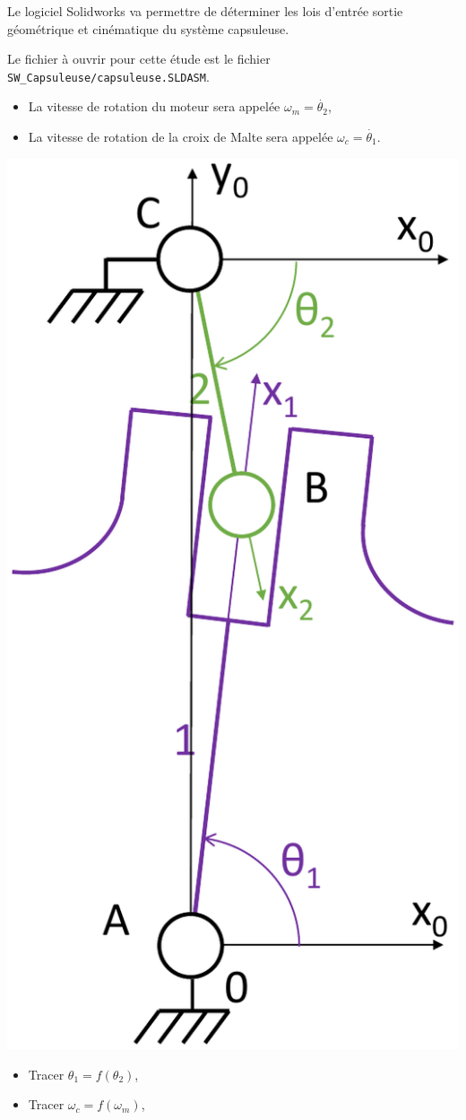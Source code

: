 
\newpage


Le logiciel Solidworks va permettre de déterminer les lois d'entrée sortie géométrique et cinématique du système capsuleuse.

Le fichier à ouvrir pour cette étude est le fichier \verb?SW_Capsuleuse/capsuleuse.SLDASM?.

\begin{itemize}
 \item La vitesse de rotation du moteur sera appelée $\omega_m=\dot{\theta_2}$,
 \item La vitesse de rotation de la croix de Malte sera appelée $\omega_c=\dot{\theta_1}$.
\end{itemize}

\begin{center}
 \includegraphics[width=0.3\linewidth]{img/Capsuleuse_cinematique}
\end{center}


\begin{itemize}
 \item Tracer $\theta_1=f(\theta_2)$,
 \item Tracer $\omega_c=f(\omega_m)$,
\end{itemize}


